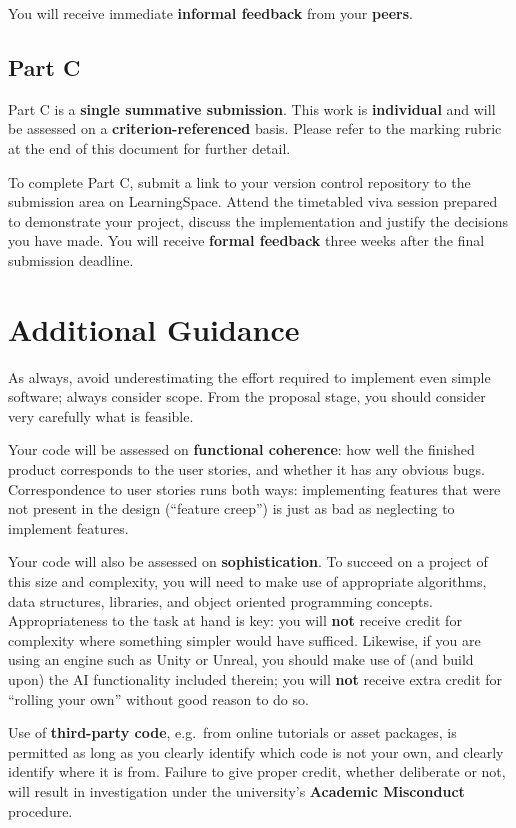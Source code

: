 \documentclass{../../fal_assignment}
\begin{document}
You will receive immediate \textbf{informal feedback} from your \textbf{peers}.

\subsection*{Part C}

Part C is a \textbf{single summative submission}. This work is \textbf{individual} and will be assessed on a \textbf{criterion-referenced} basis. Please refer to the marking rubric at the end of this document for further detail.

To complete Part C, submit a link to your version control repository to the submission area on LearningSpace.
Attend the timetabled viva session prepared to demonstrate your project,
discuss the implementation and justify the decisions you have made.
You will receive \textbf{formal feedback} three weeks after the final submission deadline.

\section*{Additional Guidance}

As always, avoid underestimating the effort required to implement even simple software; always consider scope.
From the proposal stage, you should consider very carefully what is feasible.

Your code will be assessed on \textbf{functional coherence}:
how well the finished product corresponds to the user stories,
and whether it has any obvious bugs.
Correspondence to user stories runs both ways:
implementing features that were not present in the design (``feature creep'')
is just as bad as neglecting to implement features.

Your code will also be assessed on \textbf{sophistication}.
To succeed on a project of this size and complexity,
you will need to make use of appropriate algorithms, data structures, libraries, and object oriented programming concepts.
Appropriateness to the task at hand is key:
you will \textbf{not} receive credit for complexity  
where something simpler would have sufficed.
Likewise, if you are using an engine such as Unity or Unreal,
you should make use of (and build upon) the AI functionality included therein;
you will \textbf{not} receive extra credit for ``rolling your own'' without good reason to do so.

Use of \textbf{third-party code}, e.g.\ from online tutorials or asset packages,
is permitted as long as you clearly identify which code is not your own, and clearly identify where it is from.
Failure to give proper credit, whether deliberate or not, will result in investigation under the university's \textbf{Academic Misconduct} procedure.
\end{document}
